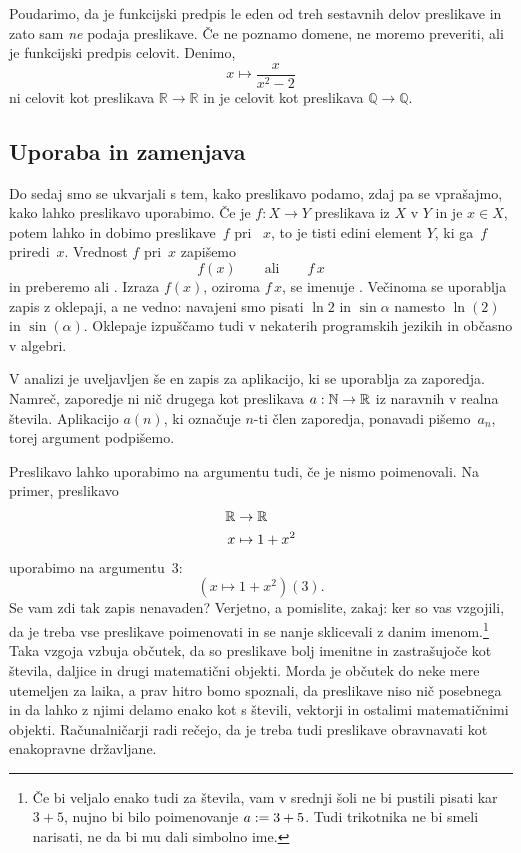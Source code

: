 Poudarimo, da je funkcijski predpis le eden od treh sestavnih delov preslikave in zato sam \emph{ne} podaja preslikave.
%
Če ne poznamo domene, ne moremo preveriti, ali je funkcijski predpis celovit. Denimo,
%
\begin{equation*}
  x \mapsto \frac{x}{x^2 - 2}
\end{equation*}
%
ni celovit kot preslikava $\mathbb{R} \to \mathbb{R}$ in je celovit kot preslikava $\mathbb{Q} \to \mathbb{Q}$.


\subsection{Uporaba in zamenjava}
\label{sec:uporaba-in-zamenjava}

Do sedaj smo se ukvarjali s tem, kako preslikavo podamo, zdaj pa se vprašajmo, kako lahko
preslikavo uporabimo. Če je $f : X \to Y$ preslikava iz $X$ v $Y$ in je $x \in X$, potem
lahko  in dobimo  preslikave~$f$ pri
~$x$, to je tisti edini element $Y$, ki ga~$f$ priredi~$x$. Vrednost $f$
pri~$x$ zapišemo
%
\begin{equation*}
  f(x)
  \qquad\text{ali}\qquad
  f\,x
\end{equation*}
%
in preberemo  ali . Izraza $f(x)$, oziroma $f\,x$, se imenuje
. Večinoma se uporablja zapis z oklepaji, a ne vedno: navajeni smo pisati
$\ln 2$ in $\sin \alpha$ namesto $\ln(2)$ in $\sin(\alpha)$. Oklepaje izpuščamo tudi v
nekaterih programskih jezikih in občasno v algebri.

V analizi je uveljavljen še en zapis za aplikacijo, ki se uporablja za zaporedja. Namreč,
zaporedje ni nič drugega kot preslikava $a : \mathbb{N} \to \mathbb{R}$ iz naravnih v realna števila.
Aplikacijo $a(n)$, ki označuje $n$-ti člen zaporedja, ponavadi pišemo~$a_n$, torej
argument podpišemo.

Preslikavo lahko uporabimo na argumentu tudi, če je nismo poimenovali. Na primer,
preslikavo
%
\begin{align*}
  \mathbb{R} &\to \mathbb{R} \\
  x &\mapsto 1 + x^2
\end{align*}
%
uporabimo na argumentu~$3$:
%
\begin{equation*}
  (x \mapsto 1 + x^2)(3).
\end{equation*}
%
Se vam zdi tak zapis nenavaden? Verjetno, a pomislite, zakaj: ker so vas vzgojili, da
je treba vse preslikave poimenovati in se nanje sklicevali z danim imenom.\footnote{Če bi veljalo enako tudi za števila, vam v srednji šoli ne bi pustili pisati kar $3 + 5$, nujno bi bilo poimenovanje $a \mathrel{{:}{=}} 3 + 5$. Tudi trikotnika ne bi smeli narisati, ne da bi mu dali simbolno ime.}
%
Taka vzgoja vzbuja občutek, da so preslikave bolj imenitne in zastrašujoče kot števila, daljice in drugi matematični objekti. Morda je občutek do neke mere utemeljen za laika, a prav hitro bomo spoznali, da preslikave niso nič
posebnega in da lahko z njimi delamo enako kot s števili, vektorji in ostalimi matematičnimi objekti. Računalničarji radi rečejo, da je treba tudi preslikave obravnavati kot enakopravne državljane.

